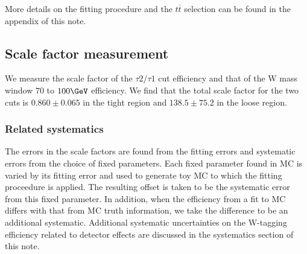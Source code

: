 More details on the fitting procedure and the $t\overline{t}$ selection can be found in the appendix of this note.

\subsection{Scale factor measurement}
We measure the scale factor of the $\tau 2/\tau 1$ cut efficiency and that of the W mass window $70$ to $100\GeVcc$ efficiency. We find that the total scale factor for the two cuts is $0.860 \pm 0.065$ in the tight region and $138.5 \pm 75.2$ in the loose region.

\subsubsection{Related systematics}
The errors in the scale factors are found from the fitting errors and systematic errors from the choice of fixed parameters. Each fixed parameter found in MC is varied by its fitting error and used to generate toy MC to which the fitting proceedure is applied. The resulting offset is taken to be the systematic error from this fixed parameter. In addition, when the efficiency from a fit to MC differs with that from MC truth information, we take the difference to be an additional systematic. 
Additional systematic uncertainties on the W-tagging efficiency related to detector effects are discussed in the systematics section of this note.
\clearpage

\fi
